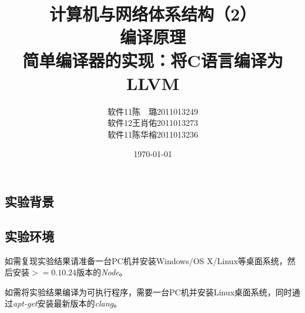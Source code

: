 \documentclass[a4paper]{article}
\begin{document}
\begin{CJK*}{UTF8}{gbsn}
    \CJKindent
    \setlength{\parindent}{2em} %
 
    \pagestyle{fancy}
  
    \title{\huge{计算机与网络体系结构（2）}\\\Large{编译原理}\\{\large 简单编译器的实现：将C语言编译为LLVM}}
    \author{
    软件11\hspace{10pt}陈　璐\hspace{10pt}2011013249\\
    软件12\hspace{10pt}王肖佑\hspace{10pt}2011013273\\
    软件11\hspace{10pt}陈华榕\hspace{10pt}2011013236
    }
    \date{\today}
    \maketitle
    \tableofcontents    
    \newpage

    \section{实验背景}
    \subsection{实验环境}
    如需复现实验结果请准备一台PC机并安装Windows/OS X/Linux等桌面系统，然后安装$>=0.10.24$版本的\textit{Node}。
    \par 如需将实验结果编译为可执行程序，需要一台PC机并安装Linux桌面系统，同时通过\textit{apt-get}安装最新版本的\textit{clang}。


\end{CJK*}
\end{document}
